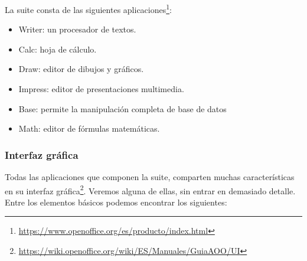 \documentclass[12pt]{article}
\begin{document}
La suite consta de las siguientes aplicaciones\footnote{\url{https://www.openoffice.org/es/producto/index.html}}:
\begin{itemize}
\item Writer: un procesador de textos.
\item Calc: hoja de cálculo.
\item Draw: editor de dibujos y gráficos.
\item Impress: editor de presentaciones multimedia.
\item Base: permite la manipulación completa de base de datos
\item Math: editor de fórmulas matemáticas.
\end{itemize}

\subsubsection{Interfaz gráfica}

Todas las aplicaciones que componen la suite, comparten muchas características en su interfaz gráfica\footnote{\url{https://wiki.openoffice.org/wiki/ES/Manuales/GuiaAOO/UI}}. Veremos alguna de ellas, sin entrar en demasiado detalle. Entre los elementos básicos podemos encontrar los siguientes:
\end{document}
